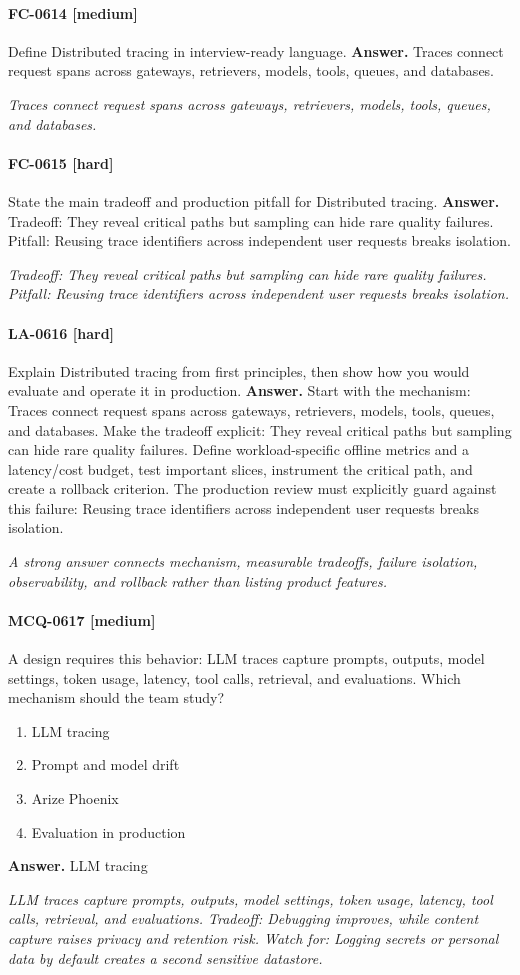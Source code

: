 \paragraph{FC-0614 [medium]} Define Distributed tracing in interview-ready language.
\noindent\textbf{Answer.} Traces connect request spans across gateways, retrievers, models, tools, queues, and databases.
\par\textit{Traces connect request spans across gateways, retrievers, models, tools, queues, and databases.}
\paragraph{FC-0615 [hard]} State the main tradeoff and production pitfall for Distributed tracing.
\noindent\textbf{Answer.} Tradeoff: They reveal critical paths but sampling can hide rare quality failures. Pitfall: Reusing trace identifiers across independent user requests breaks isolation.
\par\textit{Tradeoff: They reveal critical paths but sampling can hide rare quality failures. Pitfall: Reusing trace identifiers across independent user requests breaks isolation.}
\paragraph{LA-0616 [hard]} Explain Distributed tracing from first principles, then show how you would evaluate and operate it in production.
\noindent\textbf{Answer.} Start with the mechanism: Traces connect request spans across gateways, retrievers, models, tools, queues, and databases. Make the tradeoff explicit: They reveal critical paths but sampling can hide rare quality failures. Define workload-specific offline metrics and a latency/cost budget, test important slices, instrument the critical path, and create a rollback criterion. The production review must explicitly guard against this failure: Reusing trace identifiers across independent user requests breaks isolation.
\par\textit{A strong answer connects mechanism, measurable tradeoffs, failure isolation, observability, and rollback rather than listing product features.}
\paragraph{MCQ-0617 [medium]} A design requires this behavior: LLM traces capture prompts, outputs, model settings, token usage, latency, tool calls, retrieval, and evaluations. Which mechanism should the team study?
\begin{enumerate}[label=\Alph*.]
\item LLM tracing
\item Prompt and model drift
\item Arize Phoenix
\item Evaluation in production
\end{enumerate}
\noindent\textbf{Answer.} LLM tracing
\par\textit{LLM traces capture prompts, outputs, model settings, token usage, latency, tool calls, retrieval, and evaluations. Tradeoff: Debugging improves, while content capture raises privacy and retention risk. Watch for: Logging secrets or personal data by default creates a second sensitive datastore.}
